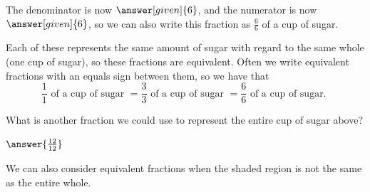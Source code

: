 \documentclass{ximera}
\begin{document}
\begin{example}
The denominator is now $\answer[given]{6}$, and the numerator is now $\answer[given]{6}$, so we can also write this fraction as $\frac{6}{6}$ of a cup of sugar. 

Each of these represents the same amount of sugar with regard to the same whole (one cup of sugar), so these fractions are equivalent. Often we write equivalent fractions with an equals sign between them, so we have that
\[
\frac{1}{1} \textrm{ of a cup of sugar } = \frac{3}{3} \textrm{ of a cup of sugar } = \frac{6}{6} \textrm{ of a cup of sugar. }
\]

\end{example}

\begin{question}
What is another fraction we could use to represent the entire cup of sugar above?

\begin{prompt}
	$\answer{\frac{12}{12}}$
\end{prompt}
\end{question}

We can also consider equivalent fractions when the shaded region is not the same as the entire whole.
\end{document}
